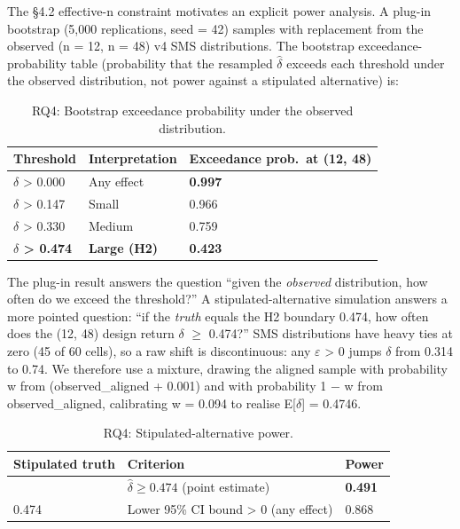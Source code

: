 \documentclass[manuscript,screen,review]{acmart}
\begin{document}
The §4.2 effective-n constraint motivates an explicit power analysis. A
plug-in bootstrap (5,000 replications, seed = 42) samples with
replacement from the observed (n = 12, n = 48) v4 SMS distributions. The
bootstrap exceedance-probability table (probability that the resampled
$\hat\delta$ exceeds each threshold under the observed distribution, not
power against a stipulated alternative) is:

{%
\begin{longtable}[]{@{}lll@{}}
\caption{RQ4: Bootstrap exceedance probability under the observed
distribution.}\label{tab:p2-10}\\
\toprule\noalign{}
Threshold & Interpretation & Exceedance prob.\ at (12, 48) \\
\midrule\noalign{}
\endhead
\bottomrule\noalign{}
\endlastfoot
$\delta$ \textgreater{} 0.000 & Any effect & \textbf{0.997} \\
$\delta$ \textgreater{} 0.147 & Small & 0.966 \\
$\delta$ \textgreater{} 0.330 & Medium & 0.759 \\
\textbf{$\delta$ \textgreater{} 0.474} & \textbf{Large (H2)} &
\textbf{0.423} \\
\end{longtable}
}

The plug-in result answers the question ``given the \emph{observed}
distribution, how often do we exceed the threshold?'' A
stipulated-alternative simulation answers a more pointed question: ``if
the \emph{truth} equals the H2 boundary 0.474, how often does the (12,
48) design return $\delta$ $\geq$ 0.474?'' SMS distributions have heavy ties at zero
(45 of 60 cells), so a raw shift is discontinuous: any $\varepsilon$ \textgreater{}
0 jumps $\delta$ from 0.314 to 0.74. We therefore use a mixture, drawing the
aligned sample with probability w from (observed\_aligned + 0.001) and
with probability 1 $-$ w from observed\_aligned, calibrating w = 0.094 to
realise E{[}$\delta${]} = 0.4746.

{%
\begin{longtable}[]{@{}lll@{}}
\caption{RQ4: Stipulated-alternative power.}\label{tab:p2-11}\\
\toprule\noalign{}
Stipulated truth & Criterion & Power \\
\midrule\noalign{}
\endfirsthead
\endhead
\bottomrule\noalign{}
\endlastfoot
0.474 & $\hat{\delta} \geq 0.474$ (point estimate) & \textbf{0.491} \\
0.474 & Lower 95\% CI bound \textgreater{} 0 (any effect) & 0.868 \\
\end{longtable}
}
\end{document}
